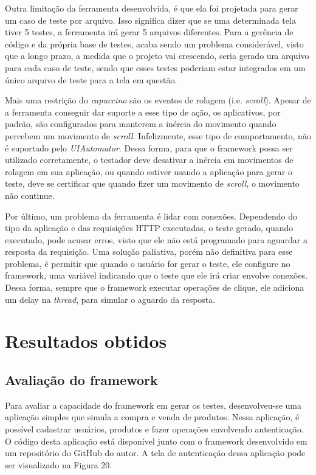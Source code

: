 \documentclass[
    12pt,       %
    openright,      %
    twoside,      %
    a4paper,      %
    english,      %
    french,       %
    spanish,      %
    brazil,       %
    ]{abntex2}
\begin{document}
        Outra limitação da ferramenta desenvolvida, é que ela foi projetada para gerar um caso de teste por
        arquivo. Isso significa dizer que se uma determinada tela tiver 5 testes, a ferramenta irá gerar 5
        arquivos diferentes. Para a gerência de código e da própria base de testes, acaba sendo um problema considerável, visto que a longo prazo, a medida que o projeto vai crescendo, seria gerado um arquivo
        para cada caso de teste, sendo que esses testes poderiam estar integrados em um único arquivo de teste
        para a tela em questão.

        Mais uma restrição do \textit{capuccino} são os eventos de rolagem (i.e. \textit{scroll}). Apesar de
        a ferramenta conseguir dar suporte a esse tipo de ação, os aplicativos, por padrão, são configurados
        para manterem a inércia do movimento quando percebem um movimento de \textit{scroll}. Infelizmente,
        esse tipo de comportamento, não é suportado pelo \textit{UIAutomator}. Dessa forma, para que o framework
        possa ser utilizado corretamente, o testador deve desativar a inércia em movimentos de rolagem em
        sua aplicação, ou quando estiver usando a aplicação para gerar o teste, deve se certificar que quando
        fizer um movimento de \textit{scroll}, o movimento não continue.

        Por último, um problema da ferramenta é lidar com conexões. Dependendo do tipo da aplicação
        e das requisições HTTP executadas, o teste gerado, quando executado, pode acusar erros, visto que ele
        não está programado para aguardar a resposta da requisição. Uma solução paliativa, porém não definitiva
        para esse problema, é permitir que quando o usuário for gerar o teste, ele configure no framework, uma
        variável indicando que o teste que ele irá criar envolve conexões. Dessa forma, sempre que o framework
        executar operações de clique, ele adiciona um delay na \textit{thread}, para simular o aguardo da
        resposta.

  \part{Resultados obtidos}
    \chapter{Avaliação do framework}
      Para avaliar a capacidade do framework em gerar os testes, desenvolveu-se uma aplicação simples que
      simula a compra e venda de produtos. Nessa aplicação, é possível cadastrar usuários, produtos e fazer
      operações envolvendo autenticação. O código desta aplicação está disponível junto com o framework
      desenvolvido em um repositório do GitHub do autor. A tela de autenticação dessa aplicação pode ser
      visualizado na Figura 20.
\end{document}
